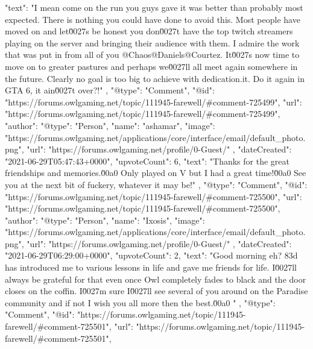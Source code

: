 {{            "text": "I mean come on the run you guys gave it was better than probably most expected. There is nothing you could have done to avoid this. Most people have moved on and let\u0027s be honest you don\u0027t have the top twitch streamers playing on the server and bringing their audience with them. I admire the work that was put in from all of you @Chaos@Daniels@Courtez. It\u0027s now time to move on to greater pastures and perhaps we\u0027ll all meet again somewhere in the future. Clearly no goal is too big to achieve with dedication.\n \n\n\tFuck it. Do it again in GTA 6, it ain\u0027t over?!\n \n"
        },
        {
            "@type": "Comment",
            "@id": "https://forums.owlgaming.net/topic/111945-farewell/#comment-725499",
            "url": "https://forums.owlgaming.net/topic/111945-farewell/#comment-725499",
            "author": {
                "@type": "Person",
                "name": "ashamar",
                "image": "https://forums.owlgaming.net/applications/core/interface/email/default_photo.png",
                "url": "https://forums.owlgaming.net/profile/0-Guest/"
            },
            "dateCreated": "2021-06-29T05:47:43+0000",
            "upvoteCount": 6,
            "text": "Thanks for the great friendships and memories.\u00a0 Only played on V but I had a great time!\u00a0 See you at the next bit of fuckery, whatever it may be!\n \n"
        },
        {
            "@type": "Comment",
            "@id": "https://forums.owlgaming.net/topic/111945-farewell/#comment-725500",
            "url": "https://forums.owlgaming.net/topic/111945-farewell/#comment-725500",
            "author": {
                "@type": "Person",
                "name": "Ixosis",
                "image": "https://forums.owlgaming.net/applications/core/interface/email/default_photo.png",
                "url": "https://forums.owlgaming.net/profile/0-Guest/"
            },
            "dateCreated": "2021-06-29T06:29:00+0000",
            "upvoteCount": 2,
            "text": "Good morning eh? \ud83d  \n\tOwlGaming has introduced me to various lessons in life and gave me friends for life. I\u0027ll always be grateful for that even once Owl completely fades to black and the door closes on the coffin. I\u0027m sure I\u0027ll see several of you around on the Paradise community and if not I wish you all more then the best.\u00a0   \n"
        },
        {
            "@type": "Comment",
            "@id": "https://forums.owlgaming.net/topic/111945-farewell/#comment-725501",
            "url": "https://forums.owlgaming.net/topic/111945-farewell/#comment-725501",
}}
